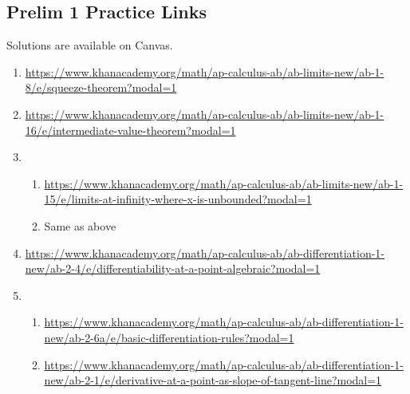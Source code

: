 \documentclass[a4paper,12pt]{article}
\begin{document}
\subsection*{Prelim 1 Practice Links}
Solutions are available on Canvas.
\begin{enumerate}
\item \url{https://www.khanacademy.org/math/ap-calculus-ab/ab-limits-new/ab-1-8/e/squeeze-theorem?modal=1}
\item \url{https://www.khanacademy.org/math/ap-calculus-ab/ab-limits-new/ab-1-16/e/intermediate-value-theorem?modal=1}
\item \begin{enumerate}
\item \url{https://www.khanacademy.org/math/ap-calculus-ab/ab-limits-new/ab-1-15/e/limits-at-infinity-where-x-is-unbounded?modal=1}
\item Same as above
\end{enumerate}
\item \url{https://www.khanacademy.org/math/ap-calculus-ab/ab-differentiation-1-new/ab-2-4/e/differentiability-at-a-point-algebraic?modal=1}
\item \begin{enumerate} 
\item \url{https://www.khanacademy.org/math/ap-calculus-ab/ab-differentiation-1-new/ab-2-6a/e/basic-differentiation-rules?modal=1}
\item \url{https://www.khanacademy.org/math/ap-calculus-ab/ab-differentiation-1-new/ab-2-1/e/derivative-at-a-point-as-slope-of-tangent-line?modal=1}
\end{enumerate}
\end{enumerate}
\end{document}
